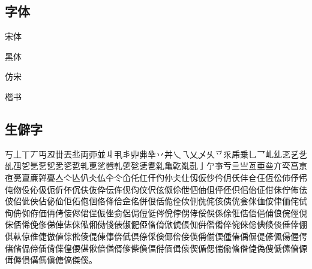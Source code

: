 \subsection{字体}

{\songti 宋体}

{\heiti 黑体}

{\fangsong 仿宋}

{\kaishu 楷书}

\subsection{生僻字}

丂丄丅丆丏丒丗丟丠両丣並丩丮丯丱丳丵丷丼乀乁乂乄乆乊乑乕乗乚乛乢乣乤乥乧乨乪乫乬乭乮乯乲乴乵乶乷乸乹乺乻乼乽乿亀亁亃亄亅亇亊亐亖亗亙亜亝亣亪亯亰亱亴亶亷亸亹亼亽亾仈仌仏仐仒仚仛仜仠仢仦仧仩仭仮仯仱仴仸仹仺仼仾伀伂伃伄伅伆伇伈伋伌伒伓伔伕伖伜伝伡伣伨伩伬伭伮伱伳伵伷伹伻伾伿佀佁佂佄佅佇佈佉佊佋佌佒佔佖佡佢佦佨佪佫佭佮佱佲併佷佸佹佺佽侀侁侂侅侇侊侌侎侐侒侓侕侘侙侚侜侞侟価侢侤侫侭侰侱侲侳侴侶侷侸侹侺侻侼侽侾俀俁係俆俇俈俉俋俌俍俒俓俔俕俖俙俛俢俤俥俧俫俬俰俲俴俵俶俷俹俻俼俽俿倀倁倂倃倄倅倇倈倊倎倐倓倕倖倗倛倝倞倠倢倣値倧倯倰倱倲倳倴倵倶倷倸倹倻倽倿偀偁偂偄偅偆偊偋偍偐偑偒偓偔偖偗偘偙偛偝偞偟偠偡偢偣偤偦偧偨偩偪偫偭偮偯偰偱偲偳偸偹偺偼偽傁傂傃傄傆傇傉傊傋傌傎傏傐傑傒。